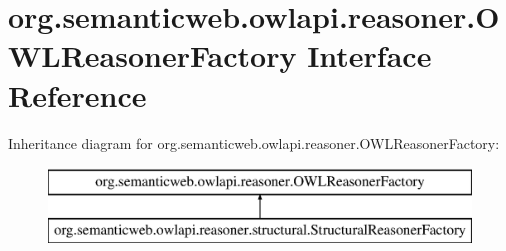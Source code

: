 \hypertarget{interfaceorg_1_1semanticweb_1_1owlapi_1_1reasoner_1_1_o_w_l_reasoner_factory}{\section{org.\-semanticweb.\-owlapi.\-reasoner.\-O\-W\-L\-Reasoner\-Factory Interface Reference}
\label{interfaceorg_1_1semanticweb_1_1owlapi_1_1reasoner_1_1_o_w_l_reasoner_factory}
}
Inheritance diagram for org.\-semanticweb.\-owlapi.\-reasoner.\-O\-W\-L\-Reasoner\-Factory\-:\begin{figure}[H]
\begin{center}
\leavevmode
\includegraphics[height=2.000000cm]{interfaceorg_1_1semanticweb_1_1owlapi_1_1reasoner_1_1_o_w_l_reasoner_factory}
\end{center}
\end{figure}
